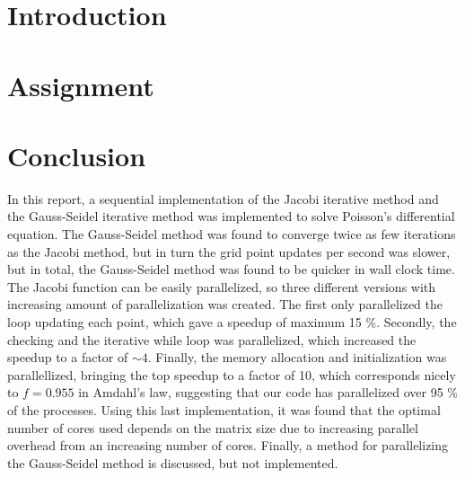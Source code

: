 


\newpage
\tableofcontents
\thispagestyle{empty}
\setcounter{page}{0}
\newpage
\section{Introduction}


\section{Assignment}













\section{Conclusion}
In this report, a sequential implementation of the Jacobi iterative method and the Gauss-Seidel iterative method was implemented to solve Poisson's differential equation. The Gauss-Seidel method was found to converge twice as few iterations as the Jacobi method, but in turn the grid point updates per second was slower, but in total, the Gauss-Seidel method was found to be quicker in wall clock time. The Jacobi function can be easily parallelized, so three different versions with increasing amount of parallelization was created. The first only parallelized the loop updating each point, which gave a speedup of maximum 15 \%. Secondly, the checking and the iterative while loop was parallelized, which increased the speedup to a factor of $\sim 4$. Finally, the memory allocation and initialization was parallellized, bringing the top speedup to a factor of 10, which corresponds nicely to $f = 0.955$ in Amdahl's law, suggesting that our code has parallelized over 95 \% of the processes. Using this last implementation, it was found that the optimal number of cores used depends on the matrix size due to increasing parallel overhead from an increasing number of cores. Finally, a method for parallelizing the Gauss-Seidel method is discussed, but not implemented.

